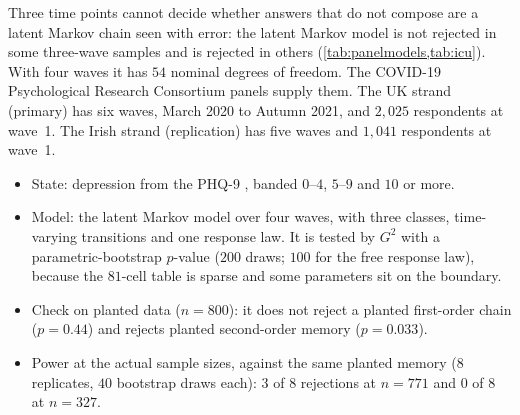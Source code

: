 \documentclass[11pt]{article}
\theoremstyle{definition}
\theoremstyle{remark}
\begin{document}
Three time points cannot decide whether answers that do not compose are a latent Markov chain seen with error: the latent Markov model
is not rejected in some three-wave samples and is rejected in others (\cref{tab:panelmodels,tab:icu}). With four waves it has $54$
nominal degrees of freedom. The COVID-19 Psychological Research Consortium panels \cite{McBride2021} supply them. The UK strand (primary) has six
waves, March 2020 to Autumn 2021, and $2{,}025$ respondents at wave~1. The Irish strand \cite{SpikolIE} (replication) has five waves and
$1{,}041$ respondents at wave~1.
\begin{itemize}[leftmargin=*,nosep]
\item State: depression from the PHQ-9 \cite{Kroenke2001}, banded $0$--$4$, $5$--$9$ and $10$ or more.
\item Model: the latent Markov model over four waves, with three classes, time-varying transitions and one response law. It is tested by
  $G^2$ with a parametric-bootstrap $p$-value ($200$ draws; $100$ for the free response law), because the $81$-cell table is sparse and
  some parameters sit on the boundary.
\item Check on planted data ($n=800$): it does not reject a planted first-order chain ($p=0.44$) and rejects planted second-order memory
  ($p=0.033$).
\item Power at the actual sample sizes, against the same planted memory ($8$ replicates, $40$ bootstrap draws each): $3$ of $8$
  rejections at $n=771$ and $0$ of $8$ at $n=327$.
\end{itemize}
\end{document}
